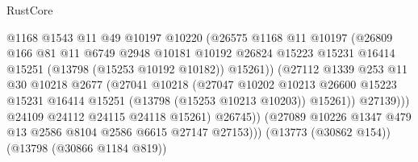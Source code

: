 \begin{lexlean}{RustCore}
\begin{coremodule}
                                      @1168
                                      @1543
                                      @11
                                      @49
                                      @10197
                                      @10220
                                      (@26575
                                        @1168
                                        @11
                                        @10197
                                        (@26809
                                          @166
                                          @81
                                          @11
                                          @6749
                                          @2948
                                          @10181
                                          @10192
                                          @26824
                                          @15223
                                          @15231
                                          @16414
                                          @15251
                                          (@13798 (@15253 @10192 @10182))
                                          @15261))
                                      (@27112
                                        @1339
                                        @253
                                        @11
                                        @30
                                        @10218
                                        @2677
                                        (@27041
                                          @10218
                                          (@27047
                                            @10202
                                            @10213
                                            @26600
                                            @15223
                                            @15231
                                            @16414
                                            @15251
                                            (@13798 (@15253 @10213 @10203))
                                            @15261))
                                        @27139)))
                                  @24109
                                  @24112
                                  @24115
                                  @24118
                                  @15261)
                                @26745))
                            (@27089 @10226 @1347 @479 @13 @2586 @8104 @2586 @6615 @27147 @27153)))
                        (@13773 (@30862 @154))
                        (@13798 (@30866 @1184 @819))

\end{coremodule}
\end{lexlean}

